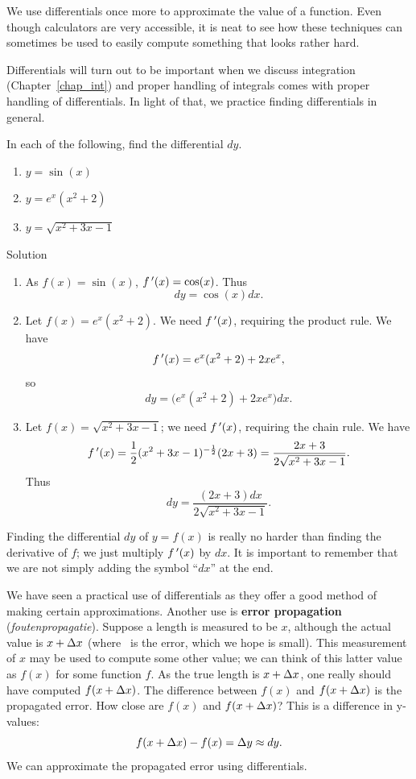 We use differentials once more to approximate the value of a function. Even though calculators are very accessible, it is neat to see how these techniques can sometimes be used to easily compute something that looks rather hard.

Differentials will  turn out to be important when we discuss integration (Chapter~\ref{chap_int}) and proper handling of integrals comes with proper handling of differentials. In light of that, we practice finding differentials in general.

\begin{example}\label{ex_diffal3}
In each of the following, find the differential $dy$.

\begin{multicols}{3}
\begin{enumerate}
 \item $y = \sin (x)$ 
 \item $y = e^x(x^2+2)$ 
 \item$y = \sqrt{x^2+3x-1}$
\end{enumerate}
\end{multicols}

Solution 

\begin{enumerate}
\item		As $f(x) = \sin (x)$, $f\,'(x) = \cos (x)$. Thus $$dy = \cos (x)dx.$$

\item		Let $f(x) = e^x(x^2+2)$. We need $f\,'(x)$, requiring the product rule. We have 
$$f\,'(x) = e^x(x^2+2) + 2xe^x,$$
so $$dy = \big(e^x(x^2+2) + 2xe^x\big)dx.$$

\item		Let $f(x) = \sqrt{x^2+3x-1}$; we need $f\,'(x)$, requiring the chain rule. We have 
$$\displaystyle f\,'(x) = \frac{1}{2}(x^2+3x-1)^{-\frac12}(2x+3) = \frac{2x+3}{2\sqrt{x^2+3x-1}}.$$
Thus 
$$ dy = \frac{(2x+3)dx}{2\sqrt{x^2+3x-1}}.$$
\end{enumerate}
\end{example}

Finding the differential $dy$ of $y=f(x)$ is really no harder than finding the derivative of $f$; we just multiply $f\,'(x)$ by $dx$. It is important to remember that we are not simply adding the symbol ``$dx$'' at the end.

We have seen a practical use of differentials as they offer a good method of making certain approximations. Another use is \textbf{error propagation} (\textit{foutenpropagatie}). Suppose a length is measured to be $x$, although the actual value is $x+\Delta x$ (where \dx\ is the error, which we hope  is small). This measurement of $x$ may be used to compute some other value; we can think of this latter value as $f(x)$ for some function $f$. As the true length is $x+\Delta x$, one really should have computed $f(x+\Delta x)$. The difference between $f(x)$ and $f(x+\Delta x)$ is the propagated error. How close are $f(x)$ and $f(x+\Delta x)$? This is a difference in y-values: 
$$f(x+\Delta x)-f(x) = \Delta y \approx dy.$$ 
We can approximate the propagated error using differentials.

